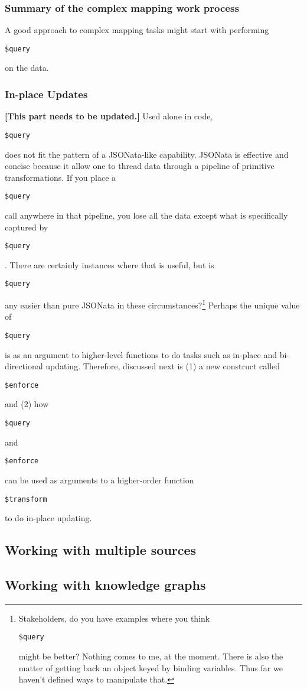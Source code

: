 \documentclass[9pt,letterpaper]{article}
\newcommand{\stt}[1]{\begin{footnotesize}\texttt{#1}\end{footnotesize}}
\begin{document}
\subsubsection{Summary of the complex mapping work process}
A good approach to complex mapping tasks might start with performing \stt{\$query} on the data.


\subsubsection{In-place Updates}

\textbf{[This part needs to be updated.]} Used alone in code, \stt{\$query} does not fit the pattern of a JSONata-like capability.
JSONata is effective and concise because it allow one to thread data through a pipeline of primitive transformations.
If you place a \stt{\$query} call anywhere in that pipeline, you lose all the data except what is specifically captured by \stt{\$query}.
There are certainly instances where that is useful, but is \stt{\$query} any easier than pure JSONata in these circumstances?\footnote{Stakeholders, do you have
  examples where you think \stt{\$query} might be better?
  Nothing comes to me, at the moment.
  There is also the matter of getting back an object keyed by binding variables.
  Thus far we haven't defined ways to manipulate that.}
Perhaps the unique value of \stt{\$query} is as an argument to higher-level functions to do tasks such as in-place and bi-directional updating.
Therefore, discussed next is (1) a new construct called \stt{\$enforce} and (2) how \stt{\$query} and \stt{\$enforce} can be used as arguments to a higher-order function \stt{\$transform} to do in-place updating.

\subsection{Working with multiple sources}

\subsection{Working with knowledge graphs}
\end{document}
